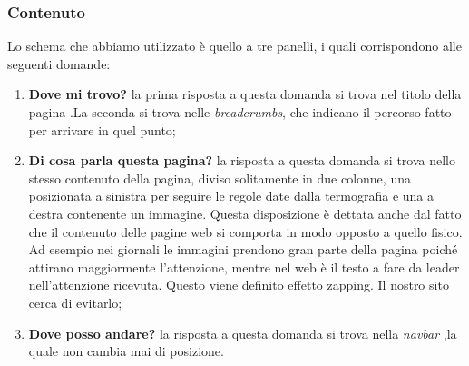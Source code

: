 \begin{center}
\end{center}

\subsubsection{Contenuto}
Lo schema che abbiamo utilizzato è quello a tre panelli, i quali corrispondono alle seguenti domande:
\begin{enumerate}
\item \textbf{Dove mi trovo?} la prima risposta a questa domanda si trova nel titolo della pagina .La seconda si trova nelle \textit{breadcrumbs}, che indicano il percorso fatto per arrivare in quel punto;
\item \textbf{Di cosa parla questa pagina?} la risposta a questa domanda si trova nello stesso contenuto della pagina, diviso solitamente in due colonne, una posizionata a sinistra per seguire le regole date dalla termografia e una a destra contenente un immagine. Questa disposizione è dettata anche dal fatto che il contenuto delle pagine web si comporta in modo opposto a quello fisico. Ad esempio nei giornali le immagini prendono gran parte della pagina poiché attirano maggiormente l'attenzione, mentre nel web è il testo a fare da leader nell’attenzione ricevuta. Questo viene definito effetto zapping. Il nostro sito cerca di evitarlo;
\item \textbf{Dove posso andare?} la risposta a questa domanda si trova nella \textit{navbar} ,la quale non cambia mai di posizione. \\
\end{enumerate}

\begin{center}
\end{center}

